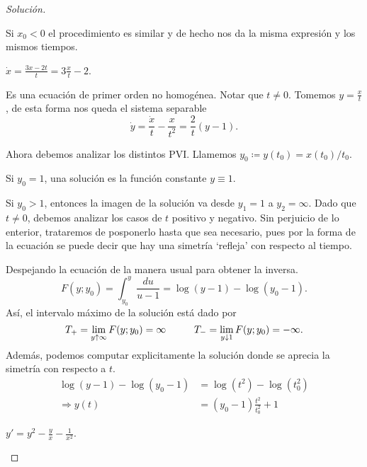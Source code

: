\begin{proof}[Solución]
\begin{plist}
\begin{clist}
    \item Si \(x_0 < 0\) el procedimiento es similar y de hecho nos da la misma
    expresión y los mismos tiempos.
\end{clist}

\item \(\dot{x} = \frac{3x-2t}{t} = 3\frac{x}{t}-2\).

Es una ecuación de primer orden no homogénea. Notar que \(t \ne 0\).
Tomemos \(y = \frac{x}{t}\), de esta forma nos queda el sistema separable
\[
    \dot{y}
    =
    \frac{\dot{x}}{t} - \frac{x}{t^2}
    =
    \frac{2}{t} \left(y - 1\right)
.\]

Ahora debemos analizar los distintos PVI. Llamemos \(y_0 \coloneqq y(t_0) =
x(t_0)/t_0\).

\begin{clist}
    \item Si \(y_0 = 1\), una solución es la función constante \(y\equiv 1\).

    \item Si \(y_0 > 1\), entonces la imagen de la solución va desde \(y_1 = 1\) a
    \(y_2 = \infty\). Dado que \(t\ne 0\), debemos analizar los casos de \(t\)
    positivo y negativo. Sin perjuicio de lo enterior, trataremos de posponerlo
    hasta que sea necesario, pues por la forma
    de la ecuación se puede decir que hay una simetría `refleja' con respecto al
    tiempo.

    Despejando la ecuación de la manera usual para obtener la inversa.
    \[
        F(y;y_0) = \int_{y_0}^{y} \frac{du}{u-1} = \log(y-1) - \log(y_0 - 1)
    .\]
    Así, el intervalo máximo de la solución está dado por
    \[
        T_{+} = \lim_{y\uparrow \infty} F(y;y_0) = \infty\\
        \hspace{1cm}
        T_{-} = \lim_{y\downarrow 1} F(y;y_0) = -\infty
    .\]
    Además, podemos computar explicitamente la solución donde se aprecia la
    simetría con respecto a \(t\).
    \begin{align*}
        \log(y-1) - \log(y_0 - 1) &= \log(t^2) - \log(t_0^2)
        \\\Rightarrow
        y(t) &= (y_0 - 1) \frac{t^2}{t_0^2} + 1
    \end{align*}
\end{clist}

\item \(y' = y^2 - \frac{y}{x} - \frac{1}{x^2}\).


\end{plist}
\end{proof}

